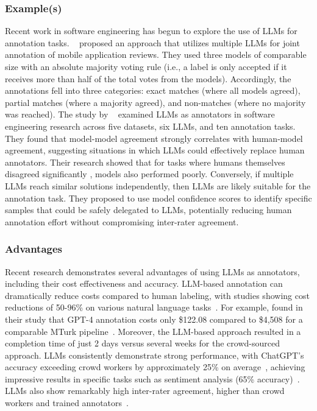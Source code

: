 \subsubsection{Example(s)}
Recent work in software engineering has begun to explore the use of LLMs for annotation tasks.
\citeauthor{Huang2023Enhancing}~\cite{Huang2023Enhancing} proposed an approach that utilizes multiple LLMs for joint annotation of mobile application reviews. 
They used three models of comparable size with an absolute majority voting rule (i.e., a label is only accepted if it receives more than half of the total votes from the models).
Accordingly, the annotations fell into three categories: exact matches (where all models agreed), partial matches (where a majority agreed), and non-matches (where no majority was reached).
The study by \citeauthor{DBLP:conf/msr/AhmedDTP25}~\cite{DBLP:conf/msr/AhmedDTP25} examined LLMs as annotators in software engineering research across five datasets, six LLMs, and ten annotation tasks.
They found that model-model agreement strongly correlates with human-model agreement, suggesting situations in which LLMs could effectively replace human annotators. Their research showed that for tasks where humans themselves disagreed significantly , models also performed poorly.
Conversely, if multiple LLMs reach similar solutions independently, then LLMs are likely suitable for the annotation task.
They proposed to use model confidence scores to identify specific samples that could be safely delegated to LLMs, potentially reducing human annotation effort without compromising inter-rater agreement.

\subsubsection{Advantages}
Recent research demonstrates several advantages of using LLMs as annotators, including their cost effectiveness and accuracy.
LLM-based annotation can dramatically reduce costs compared to human labeling, with studies showing cost reductions of 50-96\% on various natural language tasks~\cite{DBLP:conf/emnlp/WangLXZZ21}.
For example, \citeauthor{DBLP:conf/chi/HeHDRH24} found in their study that GPT-4 annotation costs only \$122.08 compared to \$4,508 for a comparable MTurk pipeline~\cite{DBLP:conf/chi/HeHDRH24}.
Moreover, the LLM-based approach resulted in a completion time of just 2 days versus several weeks for the crowd-sourced approach.
LLMs consistently demonstrate strong performance, with ChatGPT's accuracy exceeding crowd workers by approximately 25\% on average~\cite{DBLP:journals/corr/abs-2303-15056}, achieving impressive results in specific tasks such as sentiment analysis (65\% accuracy)~\cite{DBLP:journals/corr/abs-2304-10145}.
LLMs also show remarkably high inter-rater agreement, higher than crowd workers and trained annotators~\cite{DBLP:journals/corr/abs-2303-15056}.

